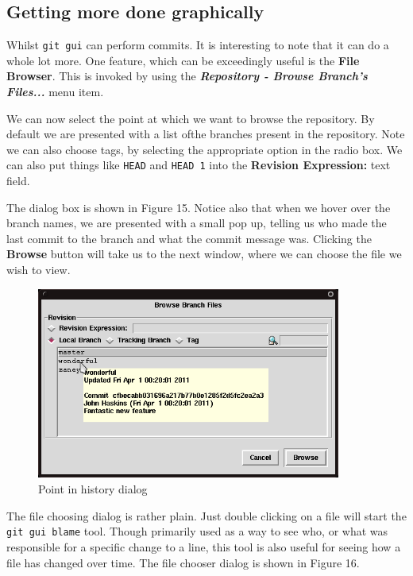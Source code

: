 \subsection{Getting more done graphically}
Whilst \texttt{git gui} can perform commits.  It is interesting to note that it can do a whole lot more.  One feature, which can be exceedingly useful is the \textbf{File Browser}.  This is invoked by using the \textbf{\emph{Repository - Browse Branch's Files...}} menu item.

We can now select the point at which we want to browse the repository.  By default we are presented with a list ofthe branches present in the repository.  Note we can also choose tags, by selecting the appropriate option in the radio box.  We can also put things like \texttt{HEAD} and \texttt{HEAD~1} into the \textbf{Revision Expression:} text field.  

The dialog box is shown in Figure 15.  Notice also that when we hover over the branch names, we are presented with a small pop up, telling us who made the last commit to the branch and what the commit message was.  Clicking the \textbf{Browse} button will take us to the next window, where we can choose the file we wish to view.

\begin{figure}[hbt]
\centering
\includegraphics[width=10cm]{images/f-w5-d15.png}
\caption{Point in history dialog}
\end{figure} 

The file choosing dialog is rather plain.  Just double clicking on a file will start the \texttt{git gui blame} tool.  Though primarily used as a way to see who, or what was responsible for a specific change to a line, this tool is also useful for seeing how a file has changed over time.  The file chooser dialog is shown in Figure 16.


